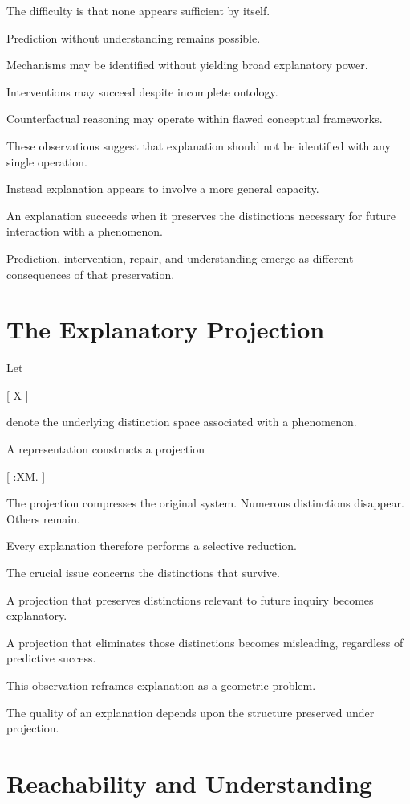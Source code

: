 \documentclass[11pt,oneside,openany]{book}
\begin{document}
The difficulty is that none appears sufficient by itself.

Prediction without understanding remains possible.

Mechanisms may be identified without yielding broad explanatory power.

Interventions may succeed despite incomplete ontology.

Counterfactual reasoning may operate within flawed conceptual frameworks.

These observations suggest that explanation should not be identified with any single operation.

Instead explanation appears to involve a more general capacity.

An explanation succeeds when it preserves the distinctions necessary for future interaction with a phenomenon.

Prediction, intervention, repair, and understanding emerge as different consequences of that preservation.

\section{The Explanatory Projection}

Let

[
X
]

denote the underlying distinction space associated with a phenomenon.

A representation constructs a projection

[
\pi:X\rightarrow M.
]

The projection compresses the original system. Numerous distinctions disappear. Others remain.

Every explanation therefore performs a selective reduction.

The crucial issue concerns the distinctions that survive.

A projection that preserves distinctions relevant to future inquiry becomes explanatory.

A projection that eliminates those distinctions becomes misleading, regardless of predictive success.

This observation reframes explanation as a geometric problem.

The quality of an explanation depends upon the structure preserved under projection.

\section{Reachability and Understanding}
\end{document}
